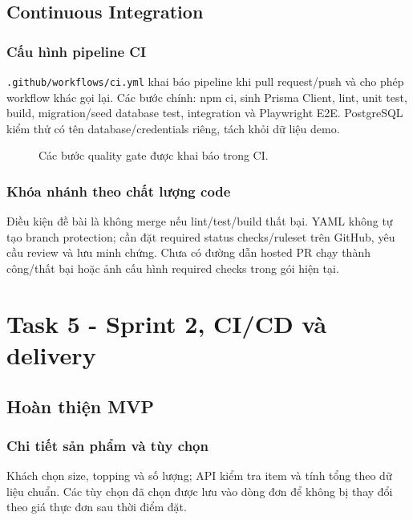 \documentclass[12pt,a4paper]{article}
\newcommand{\tep}[1]{\nolinkurl{#1}}
\begin{document}
\subsection{Continuous Integration}
\subsubsection{Cấu hình pipeline CI}
\tep{.github/workflows/ci.yml} khai báo pipeline khi pull request/push và cho phép workflow khác gọi lại. Các bước chính: npm ci, sinh Prisma Client, lint, unit test, build, migration/seed database test, integration và Playwright E2E. PostgreSQL kiểm thử có tên database/credentials riêng, tách khỏi dữ liệu demo.

\begin{figure}[H]\centering
{}
\caption{Các bước quality gate được khai báo trong CI.}
\end{figure}

\subsubsection{Khóa nhánh theo chất lượng code}
Điều kiện đề bài là không merge nếu lint/test/build thất bại. YAML không tự tạo branch protection; cần đặt required status checks/ruleset trên GitHub, yêu cầu review và lưu minh chứng. Chưa có đường dẫn hosted PR chạy thành công/thất bại hoặc ảnh cấu hình required checks trong gói hiện tại.

\clearpage
\section{Task 5 - Sprint 2, CI/CD và delivery}
\subsection{Hoàn thiện MVP}
\subsubsection{Chi tiết sản phẩm và tùy chọn}
Khách chọn size, topping và số lượng; API kiểm tra item và tính tổng theo dữ liệu chuẩn. Các tùy chọn đã chọn được lưu vào dòng đơn để không bị thay đổi theo giá thực đơn sau thời điểm đặt.
\end{document}
